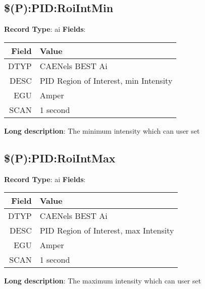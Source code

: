 \subsection{\$(P):PID:RoiIntMin}
\textbf{Record Type}: ai \newline \newline 
\textbf{Fields}: \newline 
\begin{tabularx}{0.7\linewidth}{|r|X|}
\hline Field & Value \\
\hline
\hline
DTYP & CAENels BEST Ai\\
\hline
DESC & PID Region of Interest, min Intensity\\
\hline
EGU & Amper\\
\hline
SCAN & 1 second\\
\hline
\end{tabularx}
\newline \newline \newline
\textbf{Long description}: \newline 
 The minimum intensity which can user set
\newline \newline


\subsection{\$(P):PID:RoiIntMax}
\textbf{Record Type}: ai \newline \newline 
\textbf{Fields}: \newline 
\begin{tabularx}{0.7\linewidth}{|r|X|}
\hline Field & Value \\
\hline
\hline
DTYP & CAENels BEST Ai\\
\hline
DESC & PID Region of Interest, max Intensity\\
\hline
EGU & Amper\\
\hline
SCAN & 1 second\\
\hline
\end{tabularx}
\newline \newline \newline
\textbf{Long description}: \newline 
 The maximum intensity which can user set
\newline \newline



